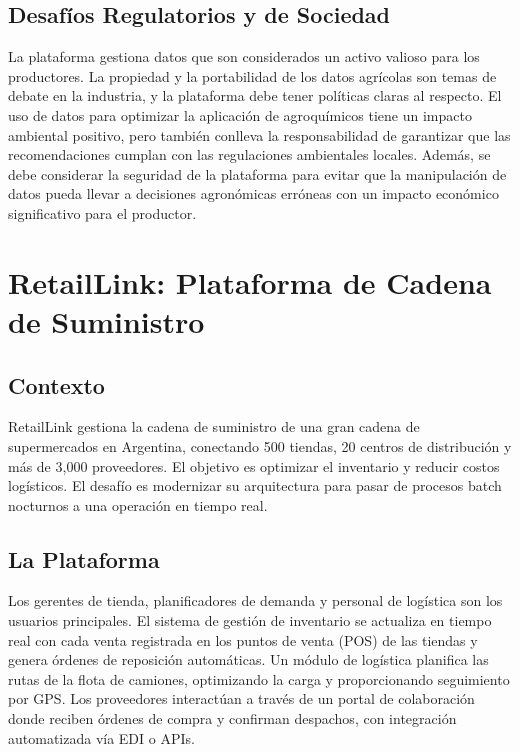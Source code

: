 \documentclass[12pt]{article}
\begin{document}
\subsection{Desafíos Regulatorios y de Sociedad}
La plataforma gestiona datos que son considerados un activo valioso para los productores. La propiedad y la portabilidad de los datos agrícolas son temas de debate en la industria, y la plataforma debe tener políticas claras al respecto. El uso de datos para optimizar la aplicación de agroquímicos tiene un impacto ambiental positivo, pero también conlleva la responsabilidad de garantizar que las recomendaciones cumplan con las regulaciones ambientales locales. Además, se debe considerar la seguridad de la plataforma para evitar que la manipulación de datos pueda llevar a decisiones agronómicas erróneas con un impacto económico significativo para el productor.

\newpage

\section{RetailLink: Plataforma de Cadena de Suministro}

\subsection{Contexto}
RetailLink gestiona la cadena de suministro de una gran cadena de supermercados en Argentina, conectando 500 tiendas, 20 centros de distribución y más de 3,000 proveedores. El objetivo es optimizar el inventario y reducir costos logísticos. El desafío es modernizar su arquitectura para pasar de procesos batch nocturnos a una operación en tiempo real.

\subsection{La Plataforma}
Los gerentes de tienda, planificadores de demanda y personal de logística son los usuarios principales. El sistema de gestión de inventario se actualiza en tiempo real con cada venta registrada en los puntos de venta (POS) de las tiendas y genera órdenes de reposición automáticas. Un módulo de logística planifica las rutas de la flota de camiones, optimizando la carga y proporcionando seguimiento por GPS. Los proveedores interactúan a través de un portal de colaboración donde reciben órdenes de compra y confirman despachos, con integración automatizada vía EDI o APIs.
\end{document}
